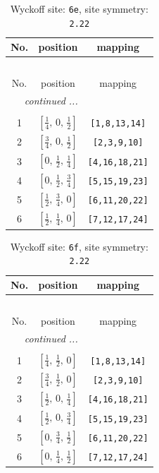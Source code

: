 \documentclass[fleqn,8pt]{jsarticle}
\begin{document}
\renewcommand{\arraystretch}{1.2}
\begin{longtable}{ccc}
\caption{Wyckoff site: {\tt 6e}, site symmetry: {\tt 2.22}}
 \\
 \hline \hline
No. & position & mapping \\ \hline \endfirsthead

\multicolumn{2}{l}{\tablename\ \thetable{}} \\
 \hline \hline
No. & position & mapping \\ \hline \endhead

 \hline \hline
\multicolumn{2}{r}{\footnotesize\it continued ...} \\ \endfoot

 \hline \hline
\multicolumn{2}{r}{} \\ \endlastfoot

1 & $\left[ \frac{1}{4},\, 0,\, \frac{1}{2} \right]$ & {\tt [1,8,13,14]} \\ \hline
2 & $\left[ \frac{3}{4},\, 0,\, \frac{1}{2} \right]$ & {\tt [2,3,9,10]} \\ \hline
3 & $\left[ 0,\, \frac{1}{2},\, \frac{1}{4} \right]$ & {\tt [4,16,18,21]} \\ \hline
4 & $\left[ 0,\, \frac{1}{2},\, \frac{3}{4} \right]$ & {\tt [5,15,19,23]} \\ \hline
5 & $\left[ \frac{1}{2},\, \frac{3}{4},\, 0 \right]$ & {\tt [6,11,20,22]} \\ \hline
6 & $\left[ \frac{1}{2},\, \frac{1}{4},\, 0 \right]$ & {\tt [7,12,17,24]} \\
\end{longtable}
\renewcommand{\arraystretch}{1.2}
\begin{longtable}{ccc}
\caption{Wyckoff site: {\tt 6f}, site symmetry: {\tt 2.22}}
 \\
 \hline \hline
No. & position & mapping \\ \hline \endfirsthead

\multicolumn{2}{l}{\tablename\ \thetable{}} \\
 \hline \hline
No. & position & mapping \\ \hline \endhead

 \hline \hline
\multicolumn{2}{r}{\footnotesize\it continued ...} \\ \endfoot

 \hline \hline
\multicolumn{2}{r}{} \\ \endlastfoot

1 & $\left[ \frac{1}{4},\, \frac{1}{2},\, 0 \right]$ & {\tt [1,8,13,14]} \\ \hline
2 & $\left[ \frac{3}{4},\, \frac{1}{2},\, 0 \right]$ & {\tt [2,3,9,10]} \\ \hline
3 & $\left[ \frac{1}{2},\, 0,\, \frac{1}{4} \right]$ & {\tt [4,16,18,21]} \\ \hline
4 & $\left[ \frac{1}{2},\, 0,\, \frac{3}{4} \right]$ & {\tt [5,15,19,23]} \\ \hline
5 & $\left[ 0,\, \frac{3}{4},\, \frac{1}{2} \right]$ & {\tt [6,11,20,22]} \\ \hline
6 & $\left[ 0,\, \frac{1}{4},\, \frac{1}{2} \right]$ & {\tt [7,12,17,24]} \\
\end{longtable}
\end{document}
